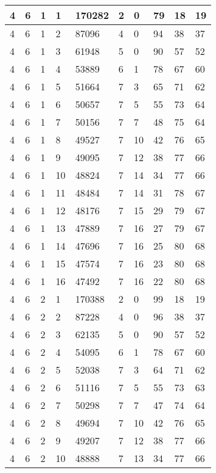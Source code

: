 \begin{table}[!ht]
\begin{tabular}{|l|l|l|l|l|l|l|l|l|l|}
        4 & 6 & 1 & 1 & 170282 & 2 & 0 & 79 & 18 & 19 \\ \hline
        4 & 6 & 1 & 2 & 87096 & 4 & 0 & 94 & 38 & 37 \\ \hline
        4 & 6 & 1 & 3 & 61948 & 5 & 0 & 90 & 57 & 52 \\ \hline
        4 & 6 & 1 & 4 & 53889 & 6 & 1 & 78 & 67 & 60 \\ \hline
        4 & 6 & 1 & 5 & 51664 & 7 & 3 & 65 & 71 & 62 \\ \hline
        4 & 6 & 1 & 6 & 50657 & 7 & 5 & 55 & 73 & 64 \\ \hline
        4 & 6 & 1 & 7 & 50156 & 7 & 7 & 48 & 75 & 64 \\ \hline
        4 & 6 & 1 & 8 & 49527 & 7 & 10 & 42 & 76 & 65 \\ \hline
        4 & 6 & 1 & 9 & 49095 & 7 & 12 & 38 & 77 & 66 \\ \hline
        4 & 6 & 1 & 10 & 48824 & 7 & 14 & 34 & 77 & 66 \\ \hline
        4 & 6 & 1 & 11 & 48484 & 7 & 14 & 31 & 78 & 67 \\ \hline
        4 & 6 & 1 & 12 & 48176 & 7 & 15 & 29 & 79 & 67 \\ \hline
        4 & 6 & 1 & 13 & 47889 & 7 & 16 & 27 & 79 & 67 \\ \hline
        4 & 6 & 1 & 14 & 47696 & 7 & 16 & 25 & 80 & 68 \\ \hline
        4 & 6 & 1 & 15 & 47574 & 7 & 16 & 23 & 80 & 68 \\ \hline
        4 & 6 & 1 & 16 & 47492 & 7 & 16 & 22 & 80 & 68 \\ \hline
        4 & 6 & 2 & 1 & 170388 & 2 & 0 & 99 & 18 & 19 \\ \hline
        4 & 6 & 2 & 2 & 87228 & 4 & 0 & 96 & 38 & 37 \\ \hline
        4 & 6 & 2 & 3 & 62135 & 5 & 0 & 90 & 57 & 52 \\ \hline
        4 & 6 & 2 & 4 & 54095 & 6 & 1 & 78 & 67 & 60 \\ \hline
        4 & 6 & 2 & 5 & 52038 & 7 & 3 & 64 & 71 & 62 \\ \hline
        4 & 6 & 2 & 6 & 51116 & 7 & 5 & 55 & 73 & 63 \\ \hline
        4 & 6 & 2 & 7 & 50298 & 7 & 7 & 47 & 74 & 64 \\ \hline
        4 & 6 & 2 & 8 & 49694 & 7 & 10 & 42 & 76 & 65 \\ \hline
        4 & 6 & 2 & 9 & 49207 & 7 & 12 & 38 & 77 & 66 \\ \hline
        4 & 6 & 2 & 10 & 48888 & 7 & 13 & 34 & 77 & 66 \\ \hline

\end{tabular}
\end{table}
